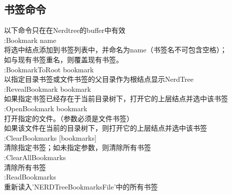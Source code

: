 \subsection{书签命令}
以下命令只在在Nerdtree的buffer中有效\\
:Bookmark name\\
    将选中结点添加到书签列表中，并命名为name（书签名不可包含空格）；\\
    如与现有书签重名，则覆盖现有书签。\\
:BookmarkToRoot bookmark\\
    以指定目录书签或文件书签的父目录作为根结点显示NerdTree\\
:RevealBookmark bookmark\\
    如果指定书签已经存在于当前目录树下，打开它的上层结点并选中该书签\\
:OpenBookmark bookmark\\
    打开指定的文件。（参数必须是文件书签）\\
    如果该文件在当前的目录树下，则打开它的上层结点并选中该书签\\
:ClearBookmarks [bookmarks]\\
    清除指定书签；如未指定参数，则清除所有书签\\
:ClearAllBookmarks\\
    清除所有书签\\
:ReadBookmarks\\
    重新读入'NERDTreeBookmarksFile'中的所有书签\\

